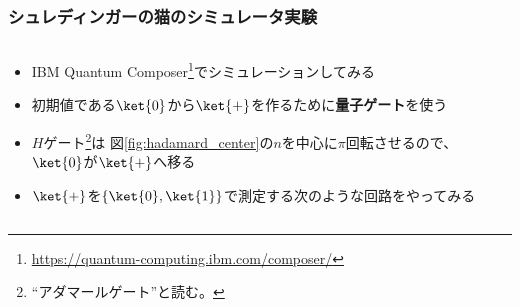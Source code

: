 \begin{frame}
  \frametitle{シュレディンガーの猫のシミュレータ実験}

  \pause
  \begin{columns}
    \begin{column}{0.6\textwidth}
      \begin{itemize}
        \item<+-> IBM Quantum Composer\footnote{\url{https://quantum-computing.ibm.com/composer/}}でシミュレーションしてみる

        \item<+-> 初期値である$\ket{0}$から$\ket{+}$を作るために\textbf{量子ゲート}を使う

        \item<+-> $H$ゲート\footnote{``アダマールゲート''と読む。}は
        図\ref{fig:hadamard_center}の$n$を中心に$\pi$回転させるので、
        $\ket{0}$が$\ket{+}$へ移る

        \item<+-> $\ket{+}$を$\left\{\ket{0}, \ket{1}\right\}$で測定する次のような回路をやってみる
        \begin{figure}
          \centering
        \end{figure}
      \end{itemize}
    \end{column}
    \begin{column}{0.4\textwidth}
    \end{column}
  \end{columns}
\end{frame}

